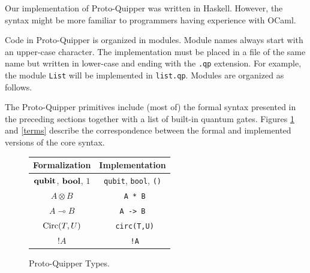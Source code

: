 Our implementation of Proto-Quipper was written in Haskell. However, the 
syntax might be more familiar to programmers having experience with OCaml.

Code in Proto-Quipper is organized in modules. Module names always start 
with an upper-case character. The implementation must be placed in a file 
of the same name but written in lower-case and ending with the {\tt.qp} 
extension. For example, the module {\tt List} will be implemented in 
{\tt list.qp}. Modules are organized as follows.

The Proto-Quipper primitives include (most of) the formal syntax presented 
in the preceding sections together with a list of built-in quantum gates. 
Figures \hyperref[types]{\ref*{types}} and \hyperref[terms]{\ref*{terms}} 
describe the correspondence between the formal and implemented versions of 
the core syntax.

\begin{figure}[!ht]
\begin{center}
\renewcommand{\arraystretch}{1.4}
\begin{tabular}{|c|c|}
  \hline
  \textbf{Formalization}    & \textbf{Implementation} \\\hline
  $\textrm{\bf qubit}$, $\textrm{\bf bool}$, $1$    & \verb#qubit#, \verb#bool#, \verb#()# \\\hline
  $A \otimes B$             & \verb# A * B# \\\hline
  $A \multimap B$           & \verb# A -> B # \\\hline
  $\mathop{\textrm{Circ}}\nolimits(T, U)$              & \verb# circ(T,U)# \\\hline
  ${!} A$                   & \verb# !A# \\\hline
\end{tabular}
\end{center}
\caption{Proto-Quipper Types.}
\label{types}
\end{figure}

